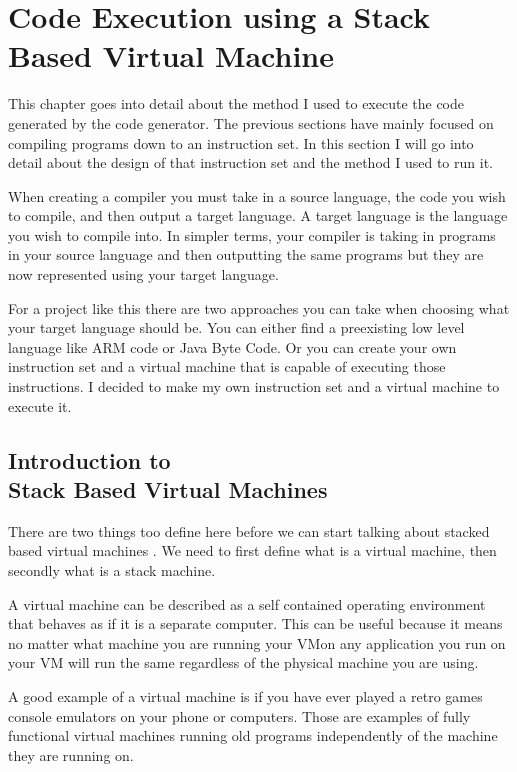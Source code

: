 
\chapter{Code Execution using a Stack Based Virtual Machine}

This chapter goes into detail about the method I used to execute the code generated by the code generator. The previous sections have mainly focused on compiling programs down to an instruction set. In this section I will go into detail about the design of that instruction set and the method I used to run it.

When creating a compiler you must take in a source language, the code you wish to compile, and then output a target language. A target language is the language you wish to compile into. In simpler terms, your compiler is taking in programs in your source language and then outputting the same programs but they are now represented using your target language.    

For a project like this there are two approaches you can take when choosing what your target language should be. You can either find a preexisting low level language like ARM code or Java Byte Code. Or you can create your own instruction set and a virtual machine that is capable of executing those instructions. I decided to make my own instruction set and a virtual machine to execute it. 


\section[Introduction to Stack Based Virtual Machines]{Introduction to \\ Stack Based Virtual Machines}

There are two things too define here before we can start talking about stacked based virtual machines . We need to first define what is a virtual machine, then secondly what is a stack machine. 

A virtual machine can be described as a self contained operating environment that behaves as if it is a separate computer\footnotemark[1] . This can be useful because it means no matter what machine you are running your VM\footnotemark[2] on any application you run on your VM will run the same regardless of the physical machine you are using.


A good example of a virtual machine is if you have ever played a retro games console emulators on your phone or computers. Those are examples of fully functional virtual machines running old programs independently of the machine they are running on. 

